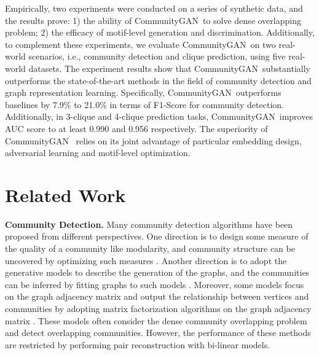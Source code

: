 \documentclass[sigconf]{acmart}
\newcommand{\ComGAN}{CommunityGAN}
\begin{document}
Empirically, two experiments were conducted on a series of synthetic data, and the results prove: 1) the ability of \ComGAN~to solve dense overlapping problem; 2) the efficacy of motif-level generation and discrimination.
Additionally, to complement these experiments, we evaluate \ComGAN~on two real-world scenarios, i.e., community detection and clique prediction, using five real-world datasets.
The experiment results show that \ComGAN~substantially outperforms the state-of-the-art methods in the field of community detection and graph representation learning.
Specifically, \ComGAN~outperforms baselines by 7.9\% to 21.0\% in terms of F1-Score for community detection.
Additionally, in 3-clique and 4-clique prediction tasks, \ComGAN~improves AUC score to at least 0.990 and 0.956 respectively.
The superiority of \ComGAN~ relies on its joint advantage of particular embedding design, adversarial learning and motif-level optimization.


\section{Related Work}

\textbf{Community Detection.}
Many community detection algorithms have been proposed from different perspectives.
One direction is to design some measure of the quality of a community like modularity, and community structure can be uncovered by optimizing such measures \cite{newman2006modularity,xiang2016local}.
Another direction is to adopt the generative models to describe the generation of the graphs, and the communities can be inferred by fitting graphs to such models \cite{hu2015community,Zhang2015PNMF}.
Moreover, some models focus on the graph adjacency matrix and output the relationship between vertices and communities by adopting matrix factorization algorithms on the graph adjacency matrix \cite{yang2013overlapping,AAAI1817142}.
These models often consider the dense community overlapping problem and detect overlapping communities.
However, the performance of these methods are restricted by performing pair reconstruction with bi-linear models.
\end{document}
